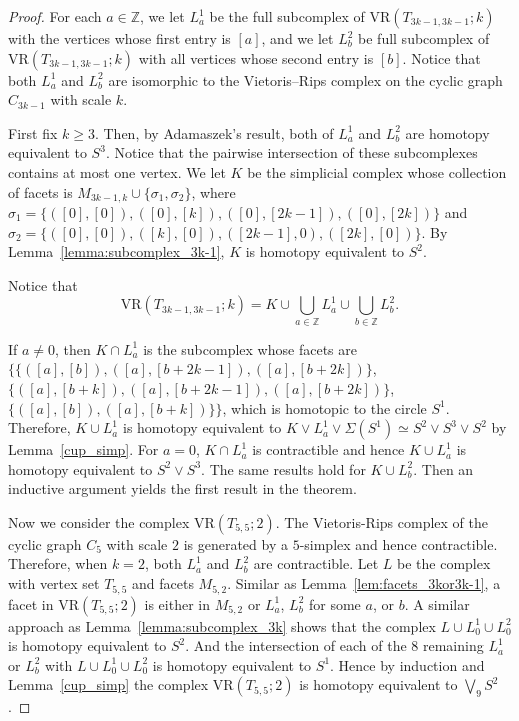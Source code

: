 \documentclass[12pt,a4paper]{amsart}
\theoremstyle{definition}
\newcommand{\Z}{\ensuremath{\mathbb{Z}}}
\newcommand{\vr}[2]{\mathrm{VR}(#1;#2)}
\numberwithin{equation}{section}
\begin{document}
\begin{proof}
For each $a\in \Z$, we let $L_a^1$ be the full subcomplex of $\vr{T_{3k-1,3k-1}}{k}$ with the vertices whose first entry is $[a]$, and we let $L_b^2$ be full subcomplex of $\vr{T_{3k-1,3k-1}}{k}$ with all vertices whose second entry is $[b]$.
Notice that both $L_a^1$ and $L_b^2$ are isomorphic to the Vietoris--Rips complex on the cyclic graph $C_{3k-1}$ with scale $k$.

First fix $k\geq 3$.
Then, by Adamaszek's result, both of $L_a^1$ and $L_b^2$  are homotopy equivalent to $S^3$.
Notice that the pairwise intersection of these subcomplexes contains at most one vertex.
We let $K$ be the simplicial complex whose collection of facets is $M_{3k-1,k}\cup \{\sigma_1, \sigma_2\}$, where $\sigma_1=\{([0], [0]), ([0], [k]), ([0], [2k-1]), ([0], [2k])\}$ and $\sigma_2=\{([0], [0]), ([k], [0]), ([2k-1], 0), ([2k], [0]) \}$.
By Lemma~\ref{lemma:subcomplex_3k-1}, $K$ is homotopy equivalent to $S^2$.

Notice that
\[\vr{T_{3k-1,3k-1}}{k}= K\cup \bigcup_{a\in \Z} L_a^1\cup \bigcup_{b\in \Z} L_b^2.\]

If $a\neq 0$, then $K\cap L_a^1$ is the subcomplex whose facets are $\{\{([a], [b]), ([a], [b+2k-1]), ([a], [b+2k])\}$, $\{([a], [b+k]), ([a], [b+2k-1]), ([a], [b+2k])\}$, $\{([a], [b]), ([a], [b+k])\}\}$, which is homotopic to the circle $S^1$.
Therefore, $K\cup L_a^1$ is homotopy equivalent to $K\vee L_a^1\vee\Sigma(S^1) \simeq S^2\vee S^3\vee S^2$ by Lemma~\ref{cup_simp}.
For $a=0$, $K\cap L_a^1$ is contractible and hence $K\cup L_a^1$ is homotopy equivalent to $S^2\vee S^3$.
The same results hold for $K\cup L_b^2$.
Then an inductive argument yields the first result in the theorem.

\medskip

Now we consider the complex $\vr{T_{5,5}}{2}$.
The Vietoris-Rips complex of the cyclic graph $C_5$ with scale $2$ is generated by a $5$-simplex and hence contractible.
Therefore, when $k=2$, both $L_a^1$ and $L_b^2$ are contractible.
Let $L$ be the complex with vertex set $T_{5, 5}$ and facets $M_{5, 2}$.
Similar as Lemma~\ref{lem:facets_3kor3k-1}, a facet in $\vr{T_{5,5}}{2}$ is either in $M_{5, 2}$ or $L_a^1$, $L_b^2$ for some $a$, or  $b$.
A similar approach as Lemma~\ref{lemma:subcomplex_3k} shows that the complex $L\cup L_0^1\cup L_0^2$ is homotopy equivalent to $S^2$.
And the intersection of each of the $8$ remaining $L_a^1$ or $L_b^2$ with $L\cup L_0^1\cup L_0^2$ is homotopy equivalent to $S^1$.
Hence by induction and Lemma~\ref{cup_simp} the complex $\vr{T_{5,5}}{2}$ is homotopy equivalent to $\bigvee_{9}S^2$.
\end{proof}
\end{document}
